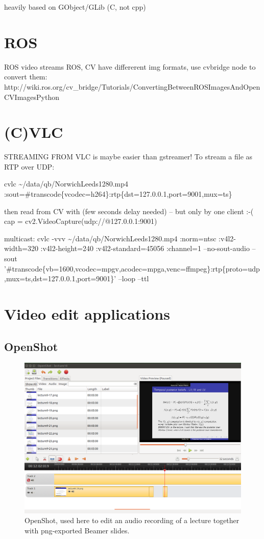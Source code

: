 \documentclass[oneside,english]{scrbook}
\begin{document}
heavily based on GObject/GLib (C, not cpp)



\chapter{ROS}

ROS video streams ROS, CV have differerent img formats, use cvbridge
node to convert them: http://wiki.ros.org/cv\_bridge/Tutorials/ConvertingBetweenROSImagesAndOpenCVImagesPython


\chapter{(C)VLC}

STREAMING FROM VLC is maybe easier than gstreamer! To stream a file
as RTP over UDP:

cvlc \textasciitilde{}/data/qb/NorwichLeeds1280.mp4 :sout=\#transcode\{vcodec=h264\}:\textquotedbl{}rtp\{dst=127.0.0.1,port=9001,mux=ts\}\textquotedbl{}

then read from CV with (few seconds delay needed) -- but only by one
client :-( cap = cv2.VideoCapture(\textquotedbl{}udp://@127.0.0.1:9001\textquotedbl{})

multicast: cvlc -vvv \textasciitilde{}/data/qb/NorwichLeeds1280.mp4
:norm=ntsc :v4l2-width=320 :v4l2-height=240 :v4l2-standard=45056 :channel=1
--no-sout-audio --sout '\#transcode\{vb=\textquotedbl{}1600\textquotedbl{},vcodec=mpgv,acodec=mpga,venc=ffmpeg\}:rtp\{proto=udp,mux=ts,dst=127.0.0.1,port=9001\}'
--loop --ttl 

\chapter{Video edit applications}

\section{OpenShot}

\begin{figure}
  \centering
  \includegraphics[width=\columnwidth]{figs/openshot.png}
	\caption{OpenShot, used here to edit an audio recording of a lecture together with png-exported Beamer slides.}
  \label{fig:jack-settings}
\end{figure}
\end{document}
